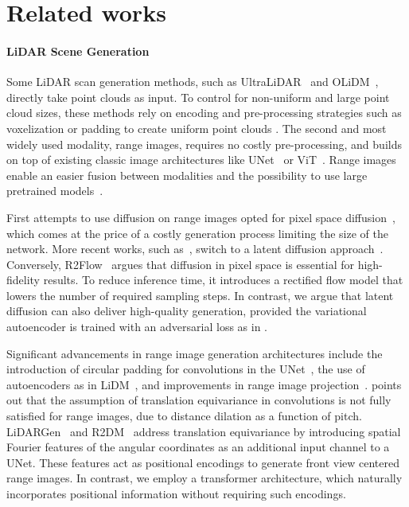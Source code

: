 \section{Related works}
\label{sec:rw}

\paragraph{LiDAR Scene Generation}


Some LiDAR scan generation methods, such as UltraLiDAR~\cite{xiong_ultralidar_2023} and OLiDM~\cite{yan2025olidm}, directly take point clouds as input.
To control for non-uniform and large point cloud sizes, these methods rely on encoding and pre-processing strategies such as voxelization or padding to create uniform point clouds \cite{kirby2024logen}.
The second and most widely used modality, range images, requires no costly pre-processing, and builds on top of existing classic image architectures like UNet~\cite{milioto_rangenet_2019} or ViT~\cite{ando_rangevit_2023}.
Range images enable an easier fusion between modalities and the possibility to use large pretrained models~\cite{buburuzan_mobi_2025}.

First attempts to use diffusion on range images opted for pixel space diffusion~\cite{zyrianov2022learning, nakashima_lidar_2024,zhu2025spiral}, which comes at the price of a costly generation process limiting the size of the network. More recent works, such as~\cite{ran_towards_2024,hu_rangeldm_2024}, switch to a latent diffusion approach~\cite{rombach_high-resolution_2022}.
Conversely, R2Flow~\cite{nakashima_fast_2025} argues that diffusion in pixel space is essential for high-fidelity results. To reduce inference time, it introduces a rectified flow model that lowers the number of required sampling steps. In contrast, we argue that latent diffusion can also deliver high-quality generation, provided the variational autoencoder is trained with an adversarial loss as in \cite{hu_rangeldm_2024}.

Significant advancements in range image generation architectures include the introduction of circular padding for convolutions in the UNet~\cite{milioto_rangenet_2019,ran_towards_2024,nakashima_lidar_2024}, the use of autoencoders as in LiDM~\cite{ran_towards_2024}, and improvements in range image projection~\cite{triess_scan-based_2020, hu_rangeldm_2024}.
\cite{triess_scan-based_2020} points out that the assumption of translation equivariance in convolutions is not fully satisfied for range images, due to distance dilation as a function of pitch.
LiDARGen~\cite{zyrianov2022learning} and R2DM~\cite{nakashima_lidar_2024} address translation equivariance by introducing spatial Fourier features of the angular coordinates as an additional input channel to a UNet. These features act as positional encodings to generate front view centered range images.
In contrast, we employ a transformer architecture, which naturally incorporates positional information without requiring such encodings.


